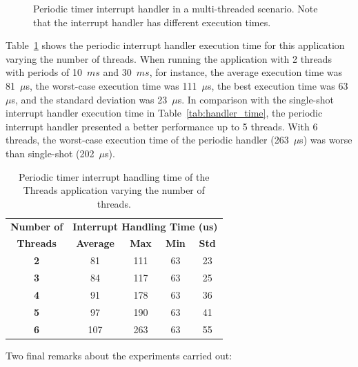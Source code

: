 \documentclass[final,3pd,times]{elsarticle}
\newcommand{\fig}[4][tbp]{
  \begin{figure}[#1]
    {\centering{\texttt{[image: \#2]}}\par}
    \caption{#3}
    \label{fig:#2}
  \end{figure}
}
\newcommand{\us}{$\mu$s}
\newcommand{\ms}{$ms$}
\begin{document}
\fig[ht]{periodic_handler}{Periodic timer interrupt handler in a
  multi-threaded scenario. Note that the interrupt handler has different
  execution times.}{scale=.6}

Table~\ref{tab:thread_test} shows the periodic interrupt handler
execution time for this application varying the number of threads. When
running the application with 2 threads with periods of 10~\ms{} and
30~\ms{}, for instance, the average execution time was 81~\us{}, the
worst-case execution time was 111~\us{}, the best execution time was
63~\us{}, and the standard deviation was 23~\us{}. In comparison with
the single-shot interrupt handler execution time in
Table~\ref{tab:handler_time}, the periodic interrupt handler presented a
better performance up to 5 threads. With 6 threads, the worst-case
execution time of the periodic handler (263~\us{}) was worse than
single-shot (202~\us{}).

\begin{table}[ht]
\centering
\scriptsize{
\begin{tabular}{c|c|c|c|c}
\textbf{Number of}	& \multicolumn{4}{c}{\textbf{Interrupt Handling Time (us)}} \\
\cline{2-5}
\textbf{Threads}	& \textbf{Average}	& \textbf{Max} 	& \textbf{Min} & \textbf{Std} \\
\hline
\textbf{2} & 81  & 111   & 63   & 23 \\
\textbf{3} & 84  & 117   & 63   & 25 \\
\textbf{4} & 91  & 178   & 63   & 36 \\
\textbf{5} & 97  & 190   & 63   & 41 \\
\textbf{6} & 107 & 263   & 63   & 55 \\
\end{tabular}
}
\caption{Periodic timer interrupt handling time of the Threads application varying the number of threads.}
\label{tab:thread_test}
\end{table}

Two final remarks about the experiments carried out:
\end{document}
